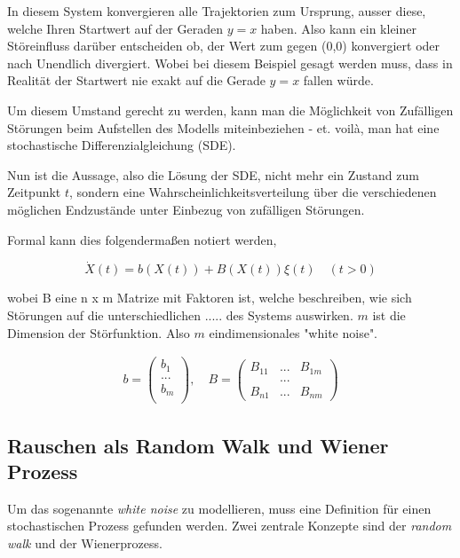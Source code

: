 In diesem System konvergieren alle Trajektorien zum Ursprung, ausser diese, welche Ihren Startwert auf der Geraden $ y = x $ haben. Also kann ein kleiner Störeinfluss darüber entscheiden ob, der Wert zum gegen (0,0) konvergiert oder nach Unendlich divergiert. Wobei bei diesem Beispiel gesagt werden muss, dass in Realität der Startwert nie exakt auf die Gerade $ y = x $ fallen würde.




Um diesem Umstand gerecht zu werden, kann man die Möglichkeit von Zufälligen Störungen beim Aufstellen des Modells miteinbeziehen - et. voilà, man hat eine stochastische Differenzialgleichung (SDE).

Nun ist die Aussage, also die Lösung der SDE, nicht mehr ein Zustand zum Zeitpunkt $ t $, sondern eine Wahrscheinlichkeitsverteilung über die verschiedenen möglichen Endzustände unter Einbezug von zufälligen Störungen.

Formal kann dies folgendermaßen notiert werden, 

\begin{equation}
\label{brown:SDGL:whiteNoise}
\dot{X}(t) = b(X(t)) + B(X(t))\xi(t) \quad (t>0)
\end{equation}

wobei B eine n x m Matrize mit Faktoren ist, welche beschreiben, wie sich Störungen auf die unterschiedlichen ..... des Systems auswirken. $ m $ ist die Dimension der Störfunktion. Also $ m $ eindimensionales "white noise".

\begin{align*}
		b = 
	\begin{pmatrix}
		b_{1} \\
		...\\
		b_{m}\\ 
	\end{pmatrix}
	, \quad
	B = 
	\begin{pmatrix}
		B_{11} & ... & B_{1m} \\
		& ... & \\
		B_{n1} & ... & B_{nm} 
	\end{pmatrix}
\end{align*}


\subsection{Rauschen als Random Walk und Wiener Prozess
\label{brown:SDGL:Wiener}}

Um das sogenannte \textit{white noise} zu modellieren, muss eine Definition für einen stochastischen Prozess gefunden werden. Zwei zentrale Konzepte sind der \textit{random walk} und der Wienerprozess.

